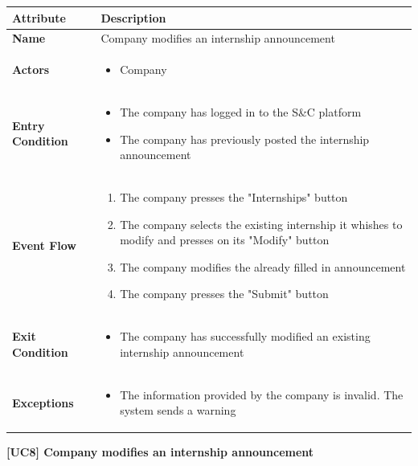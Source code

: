 \begin{center}
    \begin{tabular}{|p{3cm}|p{9cm}|}
    \hline
    \textbf{Attribute} & \textbf{Description} \\ \hline
    \textbf{Name} & Company modifies an internship announcement \\ \hline
    \textbf{Actors} & 
    \begin{itemize}
        \item Company
    \end{itemize} \\ \hline
    \textbf{Entry Condition} & 
    \begin{itemize}
        \item The company has logged in to the S\&C platform
        \item The company has previously posted the internship announcement
    \end{itemize}\\ \hline
    \textbf{Event Flow} & 
    \begin{enumerate}
        \item The company presses the "Internships" button 
        \item The company selects the existing internship it whishes to modify and presses on its "Modify" button
        \item The company modifies the already filled in announcement 
        \item The company presses the "Submit" button
    \end{enumerate} \\ \hline
    \textbf{Exit Condition} &
    \begin{itemize}
        \item The company has successfully modified an existing internship announcement
    \end{itemize} \\ \hline
    \textbf{Exceptions} & 
    \begin{itemize}
        \item [5.a] The information provided by the company is invalid. The system sends a warning
    \end{itemize} \\ \hline
    \end{tabular}
    \newline
    \newline
    \textbf{[UC8] Company modifies an internship announcement}
    \newline
    \newline



\end{center}

